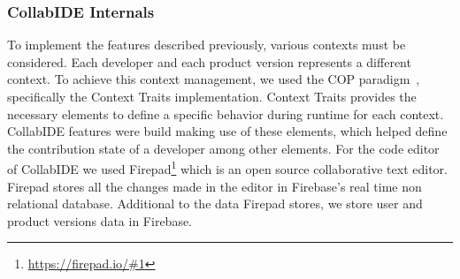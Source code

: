 \subsubsection{CollabIDE Internals}
To implement the features described previously, various contexts must be considered. Each developer 
and each product version represents a different context. To achieve this context management, we used 
the \ac{COP} paradigm~\cite{salvaneschi+12survey}, specifically the Context Traits implementation. 
Context Traits provides the necessary elements to define a specific behavior during runtime for each 
context. CollabIDE features were build making use of these elements, which helped define the 
contribution state of a developer among other elements.
For the code editor of CollabIDE we used Firepad\footnote{\url{https://firepad.io/\#1}} which is an open 
source collaborative text editor. Firepad stores all the changes made in the editor in Firebase’s real 
time non relational database. Additional to the data Firepad stores, we store user and product versions 
data in Firebase.

\endinput
